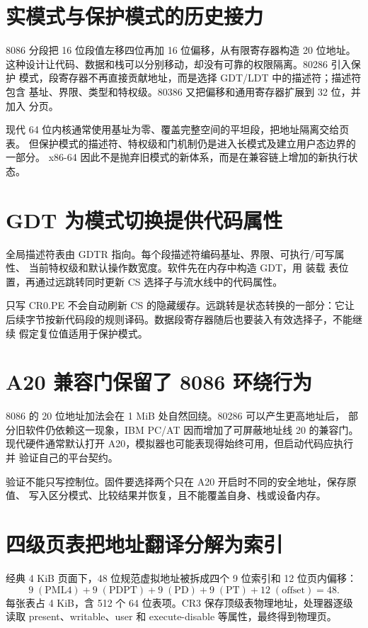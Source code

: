 \section{实模式与保护模式的历史接力}

8086 分段把 16 位段值左移四位再加 16 位偏移，从有限寄存器构造 20 位地址。
这种设计让代码、数据和栈可以分别移动，却没有可靠的权限隔离。80286 引入保护
模式，段寄存器不再直接贡献地址，而是选择 GDT/LDT 中的描述符；描述符包含
基址、界限、类型和特权级。80386 又把偏移和通用寄存器扩展到 32 位，并加入
分页。

现代 64 位内核通常使用基址为零、覆盖完整空间的平坦段，把地址隔离交给页表。
但保护模式的描述符、特权级和门机制仍是进入长模式及建立用户态边界的一部分。
x86-64 因此不是抛弃旧模式的新体系，而是在兼容链上增加的新执行状态。

\section{GDT 为模式切换提供代码属性}

全局描述符表由 GDTR 指向。每个段描述符编码基址、界限、可执行/可写属性、
当前特权级和默认操作数宽度。软件先在内存中构造 GDT，用  装载
表位置，再通过远跳转同时更新 CS 选择子与流水线中的代码属性。

只写 CR0.PE 不会自动刷新 CS 的隐藏缓存。远跳转是状态转换的一部分：它让
后续字节按新代码段的规则译码。数据段寄存器随后也要装入有效选择子，不能继续
假定复位值适用于保护模式。

\section{A20 兼容门保留了 8086 环绕行为}

8086 的 20 位地址加法会在 1 MiB 处自然回绕。80286 可以产生更高地址后，
部分旧软件仍依赖这一现象，IBM PC/AT 因而增加了可屏蔽地址线 20 的兼容门。
现代硬件通常默认打开 A20，模拟器也可能表现得始终可用，但启动代码应执行并
验证自己的平台契约。

验证不能只写控制位。固件要选择两个只在 A20 开启时不同的安全地址，保存原值、
写入区分模式、比较结果并恢复，且不能覆盖自身、栈或设备内存。

\section{四级页表把地址翻译分解为索引}

经典 4 KiB 页面下，48 位规范虚拟地址被拆成四个 9 位索引和 12 位页内偏移：
\[
  9\;(\mathrm{PML4})+9\;(\mathrm{PDPT})+9\;(\mathrm{PD})
  +9\;(\mathrm{PT})+12\;(\mathrm{offset})=48.
\]
每张表占 4 KiB，含 512 个 64 位表项。CR3 保存顶级表物理地址，处理器逐级
读取 present、writable、user 和 execute-disable 等属性，最终得到物理页。

